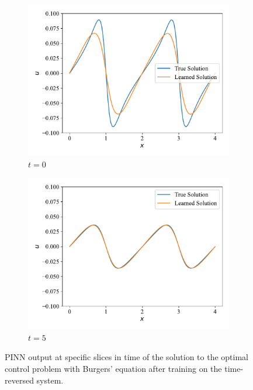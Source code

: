 \begin{figure}[H]
     \centering
     \begin{subfigure}[b]{0.45\textwidth}
         \centering
         \includegraphics[width=1.0\linewidth]{Figures/AdvancedExperiments/InitialControlCausal/reversed/burger_slice0.pdf}
         \caption{$t = 0$}
         \label{fig:burger_control_initial_slice0_reversed}
     \end{subfigure}
     \hfill
     \begin{subfigure}[b]{0.45\textwidth}
         \centering
         \includegraphics[width=1.0\linewidth]{Figures/AdvancedExperiments/InitialControlCausal/reversed/burger_slice1.pdf}
         \caption{$t = 5$}
         \label{fig:burger_control_initial_slice1_reversed}
     \end{subfigure}
    \caption{PINN output at specific slices in time of the solution to the optimal control problem with Burgers' equation after training on the time-reversed system.}
    \label{fig:burger_control_initial_slices_reversed}
\end{figure}

